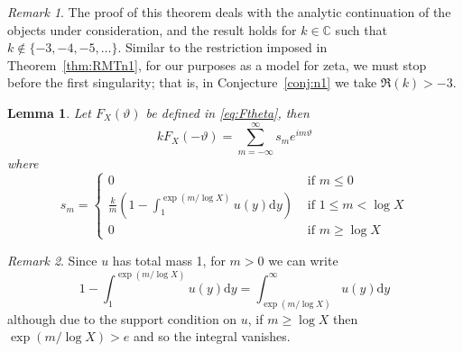 \documentclass[12pt,a4paper,reqno]{amsart}
\newtheorem{lemma}[theorem]{Lemma}
\theoremstyle{remark}
\newtheorem*{remark}{Remark}
\numberwithin{equation}{section}
\newcommand{\ii}{i}
\newcommand{\dd}{\mathrm{d}}
\newcommand{\CC}{\mathbb{C}}
\begin{document}
\begin{remark}
    The proof of this theorem  deals with the analytic continuation of the objects under consideration, and the result holds for $k \in \CC$ such that $k \not\in \{-3,-4,-5,\dots\}$. Similar to the restriction imposed in Theorem~\ref{thm:RMTn1}, for our purposes as a model for zeta, we must stop before the first singularity; that is, in Conjecture~\ref{conj:n1} we take $\Re(k)>-3$.
\end{remark}

\begin{lemma} \label{lem:FourierCoeffs}
    Let $F_X(\vartheta)$ be defined in \eqref{eq:Ftheta}, then
    \[
    k F_X(-\vartheta) = \sum_{m=-\infty}^\infty s_m e^{\ii m \vartheta}
    \]
    where
    \[
    s_m =
    \begin{cases}
    0 & \text{ if } m \leq 0\\
    \frac{k}{m}  \left(1 - \int_1^{\exp(m/\log X)} u(y) \dd y \right) & \text{ if } 1 \leq m < \log X  \\
    0 & \text{ if } m\geq \log X
    \end{cases}
    \]
\end{lemma}

\begin{remark}
    Since $u$ has total mass 1, for $m>0$ we can write
    \[
    1 - \int_1^{\exp(m/\log X)} u(y) \dd y = \int_{\exp(m/\log X)}^\infty u(y) \dd y
    \]
    although due to the support condition on $u$, if $m\geq \log X$ then $\exp(m/\log X)>e$ and so the integral vanishes.
\end{remark}
\end{document}
